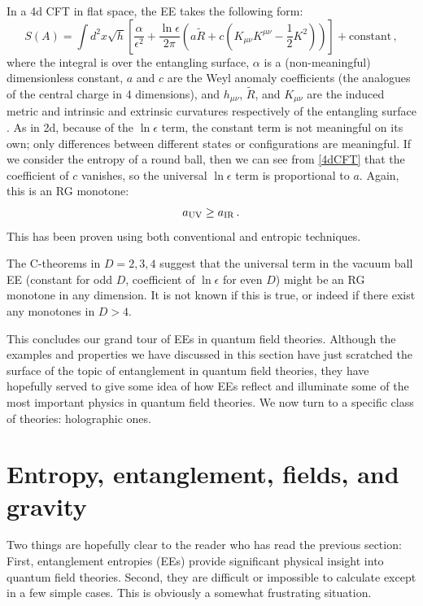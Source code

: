 \documentclass[11pt]{article}
\begin{document}
In a 4d CFT in flat space, the EE takes the following form:
\begin{equation}\label{4dCFT}
S(A) = \int d^2x\sqrt{h}\left[\frac\alpha{\epsilon^2}+\frac{\ln\epsilon}{2\pi}\left(a\tilde R + c(K_{\mu\nu}K^{\mu\nu}-\frac12K^2)\right)\right] + \text{constant}\,,
\end{equation}
where the integral is over the entangling surface, $\alpha$ is a (non-meaningful) dimensionless constant, $a$ and $c$ are the Weyl anomaly coefficients (the analogues of the central charge in 4 dimensions), and $h_{\mu\nu}$, $\tilde R$, and $K_{\mu\nu}$ are the induced metric and intrinsic and extrinsic curvatures respectively of the entangling surface \cite{Solodukhin:2008dh}. As in 2d, because of the $\ln\epsilon$ term, the constant term is not meaningful on its own; only differences between different states or configurations are meaningful. If we consider the entropy of a round ball, then we can see from \eqref{4dCFT} that the coefficient of $c$ vanishes, so the universal $\ln\epsilon$ term is proportional to $a$. Again, this is an RG monotone:
\begin{equation}
a_{\rm UV}\ge a_{\rm IR}\,.
\end{equation}
This has been proven using both conventional \cite{Komargodski:2011vj} and entropic \cite{Casini:2017vbe} techniques.

The C-theorems in $D=2,3,4$ suggest that the universal term in the vacuum ball EE (constant for odd $D$, coefficient of $\ln\epsilon$ for even $D$) might be an RG monotone in any dimension. It is not known if this is true, or indeed if there exist any monotones in $D>4$.

This concludes our grand tour of EEs in quantum field theories. Although the examples and properties we have discussed in this section have just scratched the surface of the topic of entanglement in quantum field theories, they have hopefully served to give some idea of how EEs reflect and illuminate some of the most important physics in quantum field theories. We now turn to a specific class of theories: holographic ones.




\section{Entropy, entanglement, fields, and gravity}
\label{sec:EEfieldsgravity}

Two things are hopefully clear to the reader who has read the previous section: First, entanglement entropies (EEs) provide significant physical insight into quantum field theories. Second, they are difficult or impossible to calculate except in a few simple cases. This is obviously a somewhat frustrating situation.
\end{document}
